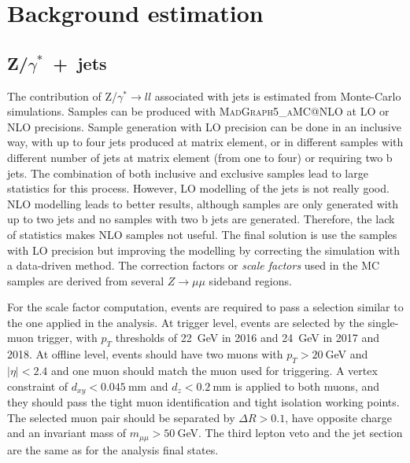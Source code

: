\documentclass[../main.tex]{subfiles}
\begin{document}



\section{Background estimation}





\subsection{Z/$\gamma^*$~+~jets}
\label{hh:subs:dy}

The contribution of Z/$\gamma^*\to ll$ associated with jets is estimated from Monte-Carlo simulations. Samples can be produced with \textsc{MadGraph5\_aMC@NLO} at LO or NLO precisions. Sample generation with LO precision can be done in an inclusive way, with up to four jets produced at matrix element, or in different samples with different number of jets at matrix element (from one to four) or requiring two b jets. The combination of both inclusive and exclusive samples lead to large statistics for this process. However, LO modelling of the jets is not really good. NLO modelling leads to better results, although samples are only generated with up to two jets and no samples with two b jets are generated. Therefore, the lack of statistics makes NLO samples not useful. The final solution is use the samples with LO precision but improving the modelling by correcting the simulation with a data-driven method. The correction factors or \textit{scale factors} used in the MC samples are derived from several $Z\to\mu\mu$ sideband regions.

For the scale factor computation, events are required to pass a selection similar to the one applied in the analysis. At trigger level, events are selected by the single-muon trigger, with $p_T$ thresholds of 22~GeV in 2016 and 24~GeV in 2017 and 2018. At offline level, events should have two muons with $p_T > 20~$GeV and $|\eta|<2.4$ and one muon should match the muon used for triggering. A vertex constraint of $d_{xy} < 0.045~$mm and $d_z < 0.2~$mm is applied to both muons, and they should pass the tight muon identification and tight isolation working points. The selected muon pair should be separated by $\Delta R>0.1$, have opposite charge and an invariant mass of $m_{\mu\mu}>50~$GeV. The third lepton veto and the jet section are the same as for the analysis final states.
\end{document}
